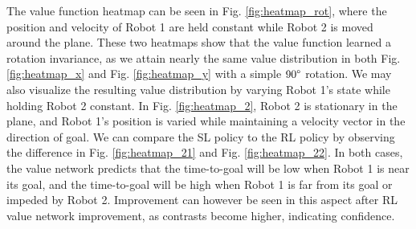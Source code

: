 \documentclass[conference]{IEEEtran}
\begin{document}
The value function heatmap can be seen in Fig. \ref{fig:heatmap_rot}, where the position and velocity of Robot 1 are held constant while Robot 2 is moved around the plane. These two heatmaps show that the value function learned a rotation invariance, as we attain nearly the same value distribution in both Fig. \ref{fig:heatmap_x} and  Fig. \ref{fig:heatmap_y} with a simple $90\degree$ rotation. We may also visualize the resulting value distribution by varying Robot 1's state while holding Robot 2 constant. In Fig. \ref{fig:heatmap_2}, Robot 2 is stationary in the plane, and Robot 1's position is varied while maintaining a velocity vector in the direction of goal. We can compare the SL policy to the RL policy by observing the difference in Fig. \ref{fig:heatmap_21} and Fig. \ref{fig:heatmap_22}. In both cases,  the value network predicts that the time-to-goal will be low when Robot 1 is near its goal, and the time-to-goal will be high when Robot 1 is far from its goal or impeded by Robot 2. Improvement can however be seen in this aspect after RL value network improvement, as contrasts become higher, indicating confidence. 
\end{document}
